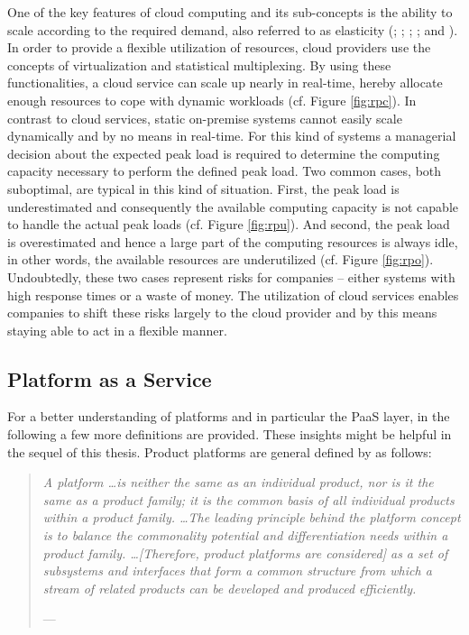 One of the key features of cloud computing and its sub-concepts is the ability to scale according to the required demand, also referred to as elasticity (\citealp[p. 4]{Foster2008}; \citealp[pp. 52-54]{Armbrust2010}; \citealp[p. 126]{Iyer2010}; \citealp[pp. 9-10]{Zhang2010}; and \citealp[p. 2]{Mell2011}). In order to provide a flexible utilization of resources, cloud providers use the concepts of virtualization and statistical multiplexing. By using these functionalities, a cloud service can scale up nearly in real-time, hereby allocate enough resources to cope with dynamic workloads (cf. Figure \ref{fig:rpc}). In contrast to cloud services, static on-premise systems cannot easily scale dynamically and by no means in real-time. For this kind of systems a managerial decision about the expected peak load is required to determine the computing capacity necessary to perform the defined peak load. Two common cases, both suboptimal, are typical in this kind of situation. First, the peak load is underestimated and consequently the available computing capacity is not capable to handle the actual peak loads (cf. Figure \ref{fig:rpu}). And second, the peak load is overestimated and hence a large part of the computing resources is always idle, in other words, the available resources are underutilized (cf. Figure \ref{fig:rpo}). Undoubtedly, these two cases represent risks for companies -- either systems with high response times or a waste of money. The utilization of cloud services enables companies to shift these risks largely to the cloud provider and by this means staying able to act in a flexible manner.

\subsection{Platform as a Service}\label{ch:tf:paas:def}

For a better understanding of platforms and in particular the \ac{PaaS} layer, in the following a few more definitions are provided. These insights might be helpful in the sequel of this thesis. Product platforms are general defined by \citet{Halman2003} as follows:

\begin{quotation}{\slshape 
A platform \ldots is neither the same as an individual product, nor is it the same as a product family; it is the common basis of all individual products within a product family. \ldots The leading principle behind the platform concept is to balance the commonality potential and differentiation needs within a product family. \ldots [Therefore, product platforms are considered] as a set of subsystems and interfaces that form a common structure from which a stream of related products can be developed and produced efficiently.}
\vspace*{-7pt}
\begin{flushright}
	--- \citealp[pp. 150-151]{Halman2003}
\end{flushright}
\end{quotation}

